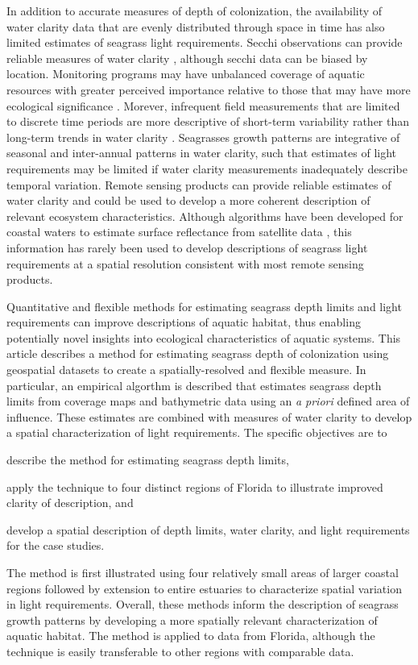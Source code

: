 \documentclass[letterpaper,12pt,oneside]{article}\usepackage[]{graphicx}\usepackage[]{color}
\begin{document}
In addition to accurate measures of depth of colonization, the availability of water clarity data that are evenly distributed through space in time has also limited estimates of seagrass light requirements.  Secchi observations can provide reliable measures of water clarity , although secchi data can be biased by location.  Monitoring programs may have unbalanced coverage of aquatic resources with greater perceived importance relative to those that may have more ecological significance \citep{Wagner08,Lottig14}.  Morever, infrequent field measurements that are limited to discrete time periods are more descriptive of short-term variability rather than long-term trends in water clarity \citep{Elsdon09}.  Seagrasses growth patterns are integrative of seasonal and inter-annual patterns in water clarity, such that estimates of light requirements may be limited if water clarity measurements inadequately describe temporal variation.  Remote sensing products can provide reliable estimates of water clarity and could be used to develop a more coherent description of relevant ecosystem characteristics.  Although algorithms have been developed for coastal waters to estimate surface reflectance from satellite data \citep{Woodruff99,Chen07}, this information has rarely been used to develop descriptions of seagrass light requirements at a spatial resolution consistent with most remote sensing products.    

Quantitative and flexible methods for estimating seagrass depth limits and light requirements can improve descriptions of aquatic habitat, thus enabling potentially novel insights into ecological characteristics of aquatic systems.  This article describes a method for estimating seagrass depth of colonization using geospatial datasets to create a spatially-resolved and flexible measure.  In particular, an empirical algorthm is described that estimates seagrass depth limits from coverage maps and bathymetric data using an \textit{a priori} defined area of influence. These estimates are combined with measures of water clarity to develop a spatial characterization of light requirements.  The specific objectives are to\begin{inparaenum}[1\upshape)]
\item describe the method for estimating seagrass depth limits, 
\item apply the technique to four distinct regions of Florida to illustrate improved clarity of description, and
\item develop a spatial description of depth limits, water clarity, and light requirements for the case studies.  
\end{inparaenum}
The method is first illustrated using four relatively small areas of larger coastal regions followed by extension to entire estuaries to characterize spatial variation in light requirements.  Overall, these methods inform the description of seagrass growth patterns by developing a more spatially relevant characterization of aquatic habitat.  The method is applied to data from Florida, although the technique is easily transferable to other regions with comparable data. 
\end{document}
